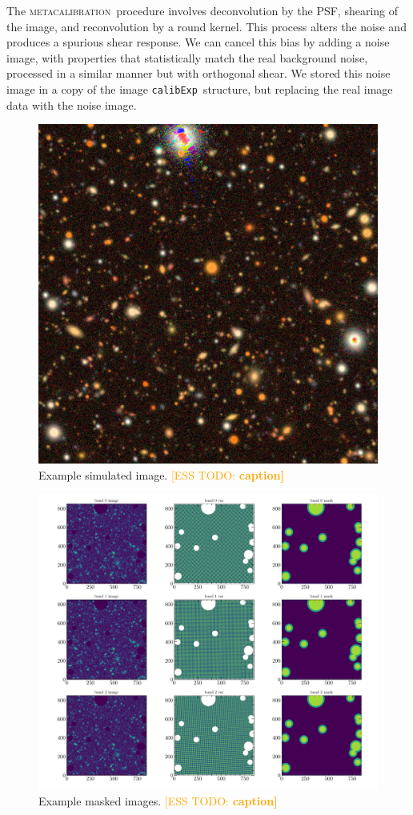 \documentclass[iop, twocolappendix, appendixfloats, numberedappendix, apj]{hackemulateapj}
\newcommand{\esstodo}[1]{\textcolor{orange}{[ESS TODO: \bf #1]}}
\newcommand{\calibexp}{\texttt{calibExp}}
\newcommand{\mcal}{\textsc{metacalibration}}
\begin{document}
The \mcal\ procedure involves deconvolution by the PSF, shearing of the image,
and reconvolution by a round kernel.  This process alters the noise and
produces a spurious shear response.  We can cancel this bias by adding a noise
image, with properties that statistically match the real background noise,
processed in a similar manner but with orthogonal shear.  We stored this
noise image in a copy of the image \calibexp\ structure, but replacing the
real image data with the noise image.

\begin{figure}
    \includegraphics[width=\columnwidth]{example-image.jpg}
    \caption{
        Example simulated image. \esstodo{caption}
    }
\end{figure}
\begin{figure}
    \includegraphics[width=\columnwidth]{example-masked-image.pdf}
    \caption{
        Example masked images. \esstodo{caption}
    }
\end{figure}
\end{document}
